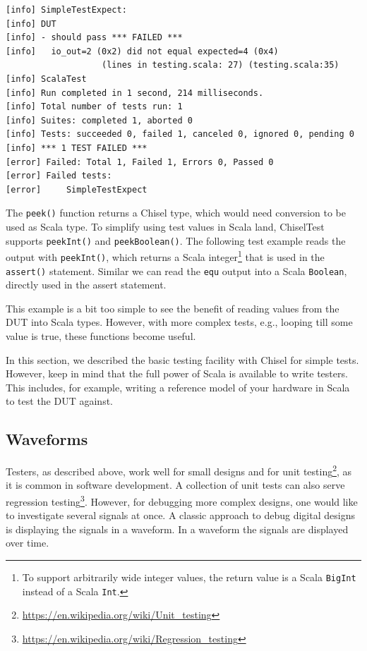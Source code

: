 \documentclass[%
    10pt,
    headinclude, footexclude,
    openright, %
    notitlepage,
    cleardoubleempty,
    headsepline,
    pointlessnumbers,
    bibtotoc, idxtotoc,
    ]{scrbook}
\newcommand{\code}[1]{{\small{\texttt{#1}}}}
\newcommand{\codefoot}[1]{{\footnotesize{\texttt{#1}}}}
\newcommand{\myref}[2]{\href{#1}{#2}}
\renewcommand{\myref}[2]{{#2}{\footnote{\url{#1}}}}
\begin{document}
\begin{verbatim}
[info] SimpleTestExpect:
[info] DUT
[info] - should pass *** FAILED ***
[info]   io_out=2 (0x2) did not equal expected=4 (0x4)
                   (lines in testing.scala: 27) (testing.scala:35)
[info] ScalaTest
[info] Run completed in 1 second, 214 milliseconds.
[info] Total number of tests run: 1
[info] Suites: completed 1, aborted 0
[info] Tests: succeeded 0, failed 1, canceled 0, ignored 0, pending 0
[info] *** 1 TEST FAILED ***
[error] Failed: Total 1, Failed 1, Errors 0, Passed 0
[error] Failed tests:
[error] 	SimpleTestExpect
\end{verbatim}

The \code{peek()} function returns a Chisel type, which would need conversion to be used
as Scala type. To simplify using test values in Scala land, ChiselTest supports \code{peekInt()}
and \code{peekBoolean()}. The following test example reads the output with \code{peekInt()},
which returns a Scala integer\footnote{To support arbitrarily wide integer values, the
return value is a Scala \codefoot{BigInt} instead of a Scala \codefoot{Int}.}
that is used in the \code{assert()} statement.
Similar we can read the \code{equ} output into a Scala \code{Boolean}, directly
used in the assert statement.


This example is a bit too simple to see the benefit of reading values from the DUT
into Scala types. However, with more complex tests, e.g., looping till some value is true,
these functions become useful.

In this section, we described the basic testing facility with Chisel for simple tests.
However, keep in mind that the full power of Scala is available to write testers.
This includes, for example, writing a reference model of your hardware in Scala to
test the DUT against.

\subsection{Waveforms}



Testers, as described above, work well for small designs and for
\myref{https://en.wikipedia.org/wiki/Unit_testing}{unit testing}, as it is common in
software development. A collection of unit tests can also serve
\myref{https://en.wikipedia.org/wiki/Regression_testing}{regression testing}. However, 
for debugging more complex designs, one would like to investigate several signals at 
once. A classic approach to debug digital designs is displaying the signals in a 
waveform. In a waveform the signals are displayed over time.
\end{document}
